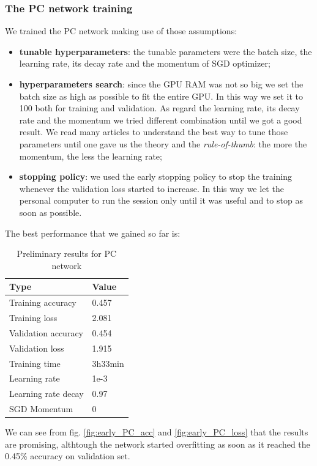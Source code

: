 \subsubsection{The PC network training}\label{sss:PC_training}
We trained the PC network making use of those assumptions:
\begin{itemize}
    \item \textbf{tunable hyperparameters}: the tunable parameters were the batch size, the learning rate, its decay rate and the momentum of SGD optimizer;
    \item \textbf{hyperparameters search}: since the GPU RAM was not so big we set the batch size as high as possible to fit the entire GPU. In this way we set it to 100 both for training and validation. As regard the learning rate, its decay rate and the momentum we tried different combination until we got a good result. We read many articles to understand the best way to tune those parameters until one \cite{SGD_momentum} gave us the theory and the \textit{rule-of-thumb}: the more the momentum, the less the learning rate;
    \item \textbf{stopping policy}: we used the early stopping policy to stop the training whenever the validation loss started to increase. In this way we let the personal computer to run the session only until it was useful and to stop as soon as possible.
\end{itemize}

The best performance that we gained so far is:
\begin{table}[!ht]
    \begin{center}
        \label{tab:PC_early_results}
        \begin{tabular}{l|l}
            \rowcolor{gray!50}
            \textbf{Type} & \textbf{Value} \\
            \hline
            Training accuracy & 0.457\\
            Training loss & 2.081\\
            Validation accuracy & 0.454\\
            Validation loss & 1.915\\
            Training time & 3h33min\\
            Learning rate & 1e-3\\
            Learning rate decay & 0.97\\
            SGD Momentum & 0\\
            \hline
        \end{tabular}
    \end{center}
    \caption{Preliminary results for PC network}
\end{table}
We can see from fig. \ref{fig:early_PC_acc} and \ref{fig:early_PC_loss} that the results are promising, althtough the network started overfitting as soon as it reached the 0.45\% accuracy on validation set.

